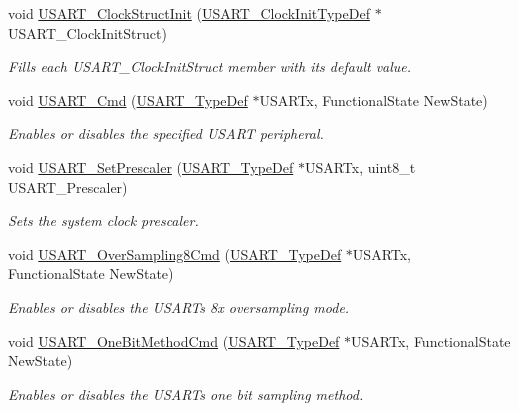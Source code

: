 \begin{DoxyCompactItemize}
void \hyperlink{group___u_s_a_r_t_ga59df27d0adda18b16ee28d47672cc724}{U\+S\+A\+R\+T\+\_\+\+Clock\+Struct\+Init} (\hyperlink{struct_u_s_a_r_t___clock_init_type_def}{U\+S\+A\+R\+T\+\_\+\+Clock\+Init\+Type\+Def} $\ast$U\+S\+A\+R\+T\+\_\+\+Clock\+Init\+Struct)
\begin{DoxyCompactList}\small\item\em Fills each U\+S\+A\+R\+T\+\_\+\+Clock\+Init\+Struct member with its default value. \end{DoxyCompactList}\item 
void \hyperlink{group___u_s_a_r_t_ga45e51626739c5f22a6567c8a85d1d85e}{U\+S\+A\+R\+T\+\_\+\+Cmd} (\hyperlink{struct_u_s_a_r_t___type_def}{U\+S\+A\+R\+T\+\_\+\+Type\+Def} $\ast$U\+S\+A\+R\+Tx, Functional\+State New\+State)
\begin{DoxyCompactList}\small\item\em Enables or disables the specified U\+S\+A\+RT peripheral. \end{DoxyCompactList}\item 
void \hyperlink{group___u_s_a_r_t_gaf5da8f2eee8245425584d85d4f62cc33}{U\+S\+A\+R\+T\+\_\+\+Set\+Prescaler} (\hyperlink{struct_u_s_a_r_t___type_def}{U\+S\+A\+R\+T\+\_\+\+Type\+Def} $\ast$U\+S\+A\+R\+Tx, uint8\+\_\+t U\+S\+A\+R\+T\+\_\+\+Prescaler)
\begin{DoxyCompactList}\small\item\em Sets the system clock prescaler. \end{DoxyCompactList}\item 
void \hyperlink{group___u_s_a_r_t_ga3897bab07491d9239f8a238a9a7cddea}{U\+S\+A\+R\+T\+\_\+\+Over\+Sampling8\+Cmd} (\hyperlink{struct_u_s_a_r_t___type_def}{U\+S\+A\+R\+T\+\_\+\+Type\+Def} $\ast$U\+S\+A\+R\+Tx, Functional\+State New\+State)
\begin{DoxyCompactList}\small\item\em Enables or disables the U\+S\+A\+RT\textquotesingle{}s 8x oversampling mode. \end{DoxyCompactList}\item 
void \hyperlink{group___u_s_a_r_t_ga3ed89ea8765d851510cfe90f7d90cbbb}{U\+S\+A\+R\+T\+\_\+\+One\+Bit\+Method\+Cmd} (\hyperlink{struct_u_s_a_r_t___type_def}{U\+S\+A\+R\+T\+\_\+\+Type\+Def} $\ast$U\+S\+A\+R\+Tx, Functional\+State New\+State)
\begin{DoxyCompactList}\small\item\em Enables or disables the U\+S\+A\+RT\textquotesingle{}s one bit sampling method. \end{DoxyCompactList}\item 

\end{DoxyCompactItemize}

